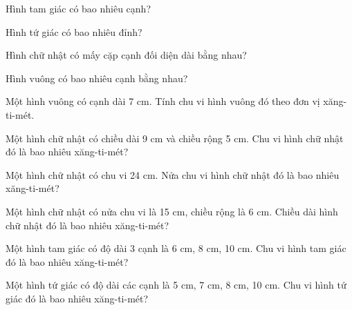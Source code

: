 \begin{ex}
Hình tam giác có bao nhiêu cạnh?
\end{ex}

\begin{ex}
Hình tứ giác có bao nhiêu đỉnh?
\end{ex}

\begin{ex}
Hình chữ nhật có mấy cặp cạnh đối diện dài bằng nhau?
\end{ex}

\begin{ex}
Hình vuông có bao nhiêu cạnh bằng nhau?
\end{ex}

\begin{ex}
Một hình vuông có cạnh dài 7 cm. Tính chu vi hình vuông đó theo đơn vị xăng-ti-mét.
\end{ex}

\begin{ex}
Một hình chữ nhật có chiều dài 9 cm và chiều rộng 5 cm. Chu vi hình chữ nhật đó là bao nhiêu xăng-ti-mét?
\end{ex}

\begin{ex}
Một hình chữ nhật có chu vi 24 cm. Nửa chu vi hình chữ nhật đó là bao nhiêu xăng-ti-mét?
\end{ex}

\begin{ex}
Một hình chữ nhật có nửa chu vi là 15 cm, chiều rộng là 6 cm. Chiều dài hình chữ nhật đó là bao nhiêu xăng-ti-mét?
\end{ex}

\begin{ex}
Một hình tam giác có độ dài 3 cạnh là 6 cm, 8 cm, 10 cm. Chu vi hình tam giác đó là bao nhiêu xăng-ti-mét?
\end{ex}

\begin{ex}
Một hình tứ giác có độ dài các cạnh là 5 cm, 7 cm, 8 cm, 10 cm. Chu vi hình tứ giác đó là bao nhiêu xăng-ti-mét?
\end{ex}

